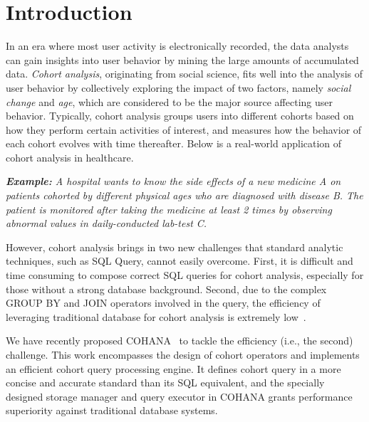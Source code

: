 \section{Introduction}
\label{sec::intro}
%
In an era where most user activity is electronically recorded, the data analysts can gain insights into user behavior by mining the large amounts of accumulated data.
\emph{Cohort analysis}, originating from social science\cite{glenn2005cohort}, fits well into the analysis of user behavior by collectively exploring the impact of two factors, namely \emph{social change} and \emph{age}, which are considered to be the major source affecting user behavior. Typically, cohort analysis groups users into different cohorts based on how they perform certain activities of interest, and measures how the behavior of each cohort evolves with time thereafter. Below is a real-world application of cohort analysis in healthcare.

\emph{\textbf{Example:} A hospital wants to know the side effects of a new medicine A on patients cohorted by different physical ages who are diagnosed with disease B. The patient is monitored after taking the medicine at least 2 times by observing abnormal values in daily-conducted lab-test C.}


However, cohort analysis brings in two new challenges that standard analytic techniques, such as SQL Query, cannot easily overcome. First, it is difficult and time consuming to compose correct SQL queries for cohort analysis, especially for those without a strong database background. Second, due to the complex GROUP BY and JOIN operators involved in the query, the efficiency of leveraging traditional database for cohort analysis is extremely low~\cite{jiang2016cohort}. %

We have recently proposed COHANA~\cite{jiang2016cohort} to tackle the efficiency (i.e., the second) challenge.
This work encompasses the design of cohort operators and implements an efficient cohort query processing engine. It defines cohort query in a more concise and accurate standard than its SQL equivalent, and the specially designed storage manager and query executor in COHANA grants performance superiority against traditional database systems. 

